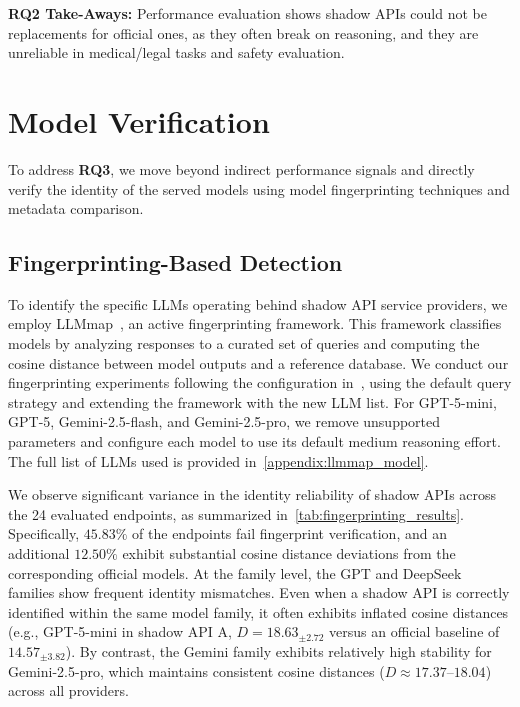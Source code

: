 \documentclass[letterpaper,twocolumn,10pt]{article}
\begin{document}
\begin{tcolorbox}[colback=gray!25!white, size=title,breakable,boxsep=1mm,colframe=white,before={\vskip1mm}, after={\vskip0mm}]
\textbf{RQ2 Take-Aways:}
Performance evaluation shows shadow APIs could not be replacements for official ones, as they often break on reasoning, and they are unreliable in medical/legal tasks and safety evaluation.
\end{tcolorbox}

\section{Model Verification}
\label{section:fingerprinting}
To address \textbf{RQ3}, we move beyond indirect performance signals and directly verify the identity of the served models using model fingerprinting techniques and metadata comparison.

\subsection{Fingerprinting-Based Detection}

To identify the specific LLMs operating behind shadow API service providers, we employ LLMmap~\cite{PKA25}, an active fingerprinting framework. 
This framework classifies models by analyzing responses to a curated set of queries and computing the cosine distance between model outputs and a reference database.
We conduct our fingerprinting experiments following the configuration in~\cite{PKA25}, using the default query strategy and extending the framework with the new LLM list.
For GPT-5-mini, GPT-5, Gemini-2.5-flash, and Gemini-2.5-pro, we remove unsupported parameters and configure each model to use its default medium reasoning effort.
The full list of LLMs used is provided in~\autoref{appendix:llmmap_model}.

We observe significant variance in the identity reliability of shadow APIs across the 24 evaluated endpoints, as summarized in~\autoref{tab:fingerprinting_results}.
Specifically, $45.83\%$ of the endpoints fail fingerprint verification, and an additional $12.50\%$ exhibit substantial cosine distance deviations from the corresponding official models.
At the family level, the GPT and DeepSeek families show frequent identity mismatches.
Even when a shadow API is correctly identified within the same model family, it often exhibits inflated cosine distances (e.g., GPT-5-mini in shadow API A, $D = 18.63_{\pm 2.72}$ versus an official baseline of $14.57_{\pm 3.82}$).
By contrast, the Gemini family exhibits relatively high stability for Gemini-2.5-pro, which maintains consistent cosine distances ($D \approx 17.37$--$18.04$) across all providers.
\end{document}
